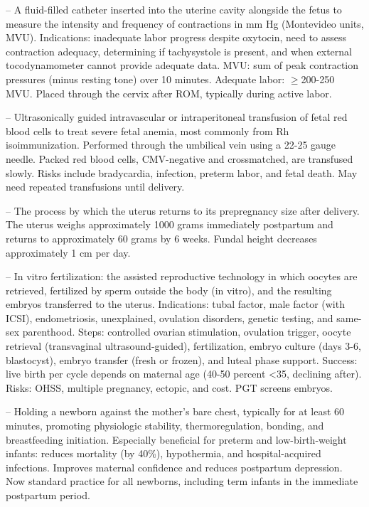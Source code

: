 -- A fluid-filled catheter inserted into the uterine cavity alongside the fetus to measure the intensity and frequency of contractions in mm Hg (Montevideo units, MVU). Indications: inadequate labor progress despite oxytocin, need to assess contraction adequacy, determining if tachysystole is present, and when external tocodynamometer cannot provide adequate data. MVU: sum of peak contraction pressures (minus resting tone) over 10 minutes. Adequate labor: \(\ge\)200-250 MVU. Placed through the cervix after ROM, typically during active labor.

-- Ultrasonically guided intravascular or intraperitoneal transfusion of fetal red blood cells to treat severe fetal anemia, most commonly from Rh isoimmunization. Performed through the umbilical vein using a 22-25 gauge needle. Packed red blood cells, CMV-negative and crossmatched, are transfused slowly. Risks include bradycardia, infection, preterm labor, and fetal death. May need repeated transfusions until delivery.

-- The process by which the uterus returns to its prepregnancy size after delivery. The uterus weighs approximately 1000 grams immediately postpartum and returns to approximately 60 grams by 6 weeks. Fundal height decreases approximately 1 cm per day.

-- In vitro fertilization: the assisted reproductive technology in which oocytes are retrieved, fertilized by sperm outside the body (in vitro), and the resulting embryos transferred to the uterus. Indications: tubal factor, male factor (with ICSI), endometriosis, unexplained, ovulation disorders, genetic testing, and same-sex parenthood. Steps: controlled ovarian stimulation, ovulation trigger, oocyte retrieval (transvaginal ultrasound-guided), fertilization, embryo culture (days 3-6, blastocyst), embryo transfer (fresh or frozen), and luteal phase support. Success: live birth per cycle depends on maternal age (40-50 percent <35, declining after). Risks: OHSS, multiple pregnancy, ectopic, and cost. PGT screens embryos.

-- Holding a newborn against the mother's bare chest, typically for at least 60 minutes, promoting physiologic stability, thermoregulation, bonding, and breastfeeding initiation. Especially beneficial for preterm and low-birth-weight infants: reduces mortality (by 40\%), hypothermia, and hospital-acquired infections. Improves maternal confidence and reduces postpartum depression. Now standard practice for all newborns, including term infants in the immediate postpartum period.

